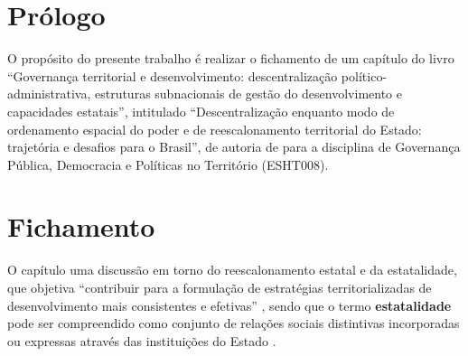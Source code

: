 \documentclass[
article,			%
11pt,				%
oneside,			%
a4paper,			%
english,			%
brazil,				%
sumario=tradicional
]{abntex2}
\begin{document}
	
	
	\frenchspacing 
	
	
	\maketitle
	

	\textual
	
	
	\section*{Prólogo}
	
	O propósito do presente trabalho é realizar o fichamento de um capítulo do livro ``Governança territorial e desenvolvimento: 	descentralização político-administrativa, estruturas subnacionais de gestão do desenvolvimento e capacidades estatais'', intitulado ``Descentralização enquanto modo de ordenamento espacial do poder e de reescalonamento territorial do Estado: trajetória e desafios para o Brasil'', de autoria de  para a disciplina de Governança Pública, Democracia e Políticas no Território (ESHT008).
	
	\section{Fichamento}
		
	O capítulo uma discussão em torno do reescalonamento estatal e da estatalidade, que objetiva ``contribuir para a formulação de estratégias territorializadas de desenvolvimento mais consistentes e efetivas'' \cite[p. 116]{brandao2011a}, sendo que o termo \textbf{estatalidade} pode ser compreendido como  conjunto de relações sociais distintivas incorporadas ou expressas através das instituições do Estado .
	
\end{document}
